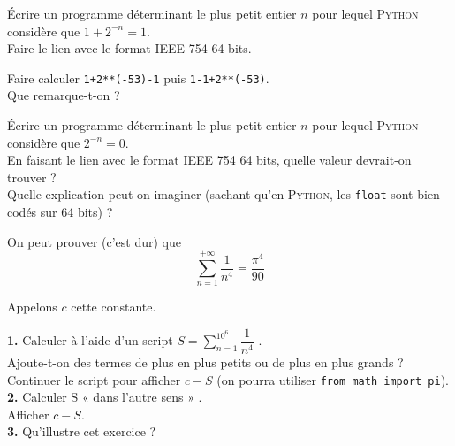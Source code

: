 \begin{exercice}
    \'Ecrire un programme déterminant le plus petit entier $n$ pour lequel \textsc{Python} considère que $1+2^{-n}=1$.\\
    Faire le lien avec le format IEEE 754 64 bits.
\end{exercice}

\begin{exercice}
    Faire calculer \texttt{1+2**(-53)-1} puis \texttt{1-1+2**(-53)}.\\
    Que remarque-t-on ?\\
\end{exercice}

\begin{exercice}
    \'Ecrire un programme déterminant le plus petit entier $n$ pour lequel \textsc{Python} considère que $2^{-n}=0$.\\
    En faisant le lien avec le format IEEE 754 64 bits, quelle valeur devrait-on trouver ?\\
    Quelle explication peut-on imaginer (sachant qu'en \textsc{Python}, les \texttt{float} sont bien codés sur 64 bits) ?
\end{exercice}

\begin{exercice}
    On peut prouver (c'est dur) que $$\sum_{n=1}^{+\infty}\dfrac{1}{n^4}=\dfrac{\pi^4}{90}$$

    Appelons $c$ cette constante.

    \textbf{1.} Calculer à l'aide d'un script $\displaystyle S=\sum_{n=1}^{10^6}\dfrac{1}{n^4}$ .\\

    Ajoute-t-on des termes de plus en plus petits ou de plus en plus grands ?\\
    Continuer le script pour afficher $c-S$ (on pourra utiliser \texttt{from math import pi}).\\

    \textbf{2.} Calculer S « dans l'autre sens » .\\
    Afficher $c-S$.\\

    \textbf{3.} Qu'illustre cet exercice ?
\end{exercice}


